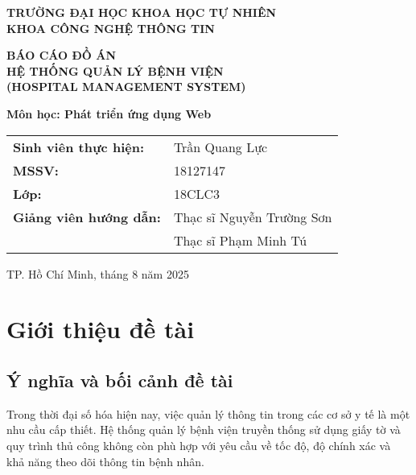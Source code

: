 \documentclass[12pt,a4paper]{report}
\begin{document}
\begin{titlepage}
    \centering
    \vspace*{1cm}
    
    {\Large\textbf{TRƯỜNG ĐẠI HỌC KHOA HỌC TỰ NHIÊN}}\\
    {\Large\textbf{KHOA CÔNG NGHỆ THÔNG TIN}}\\
    \vspace{1cm}
    \vspace{1cm}
    
    {\huge\textbf{BÁO CÁO ĐỒ ÁN}}\\
    \vspace{0.5cm}
    {\Large\textbf{HỆ THỐNG QUẢN LÝ BỆNH VIỆN}}\\
    {\Large\textbf{(HOSPITAL MANAGEMENT SYSTEM)}}\\
    \vspace{1cm}
    
    {\large\textbf{Môn học: Phát triển ứng dụng Web}}\\
    \vspace{2cm}
    
    \begin{tabular}{ll}
    	\textbf{Sinh viên thực hiện:} & Trần Quang Lực \\
    	\textbf{MSSV:} & 18127147 \\
    	\textbf{Lớp:} & 18CLC3 \\
    	\textbf{Giảng viên hướng dẫn:} & Thạc sĩ Nguyễn Trường Sơn \\
    & Thạc sĩ Phạm Minh Tú \\
    \end{tabular}
    
    \vfill
    {\large TP. Hồ Chí Minh, tháng 8 năm 2025}
\end{titlepage}

\tableofcontents
\newpage

\chapter{Giới thiệu đề tài}

\section{Ý nghĩa và bối cảnh đề tài}
Trong thời đại số hóa hiện nay, việc quản lý thông tin trong các cơ sở y tế là một nhu cầu cấp thiết. Hệ thống quản lý bệnh viện truyền thống sử dụng giấy tờ và quy trình thủ công không còn phù hợp với yêu cầu về tốc độ, độ chính xác và khả năng theo dõi thông tin bệnh nhân.
\end{document}
